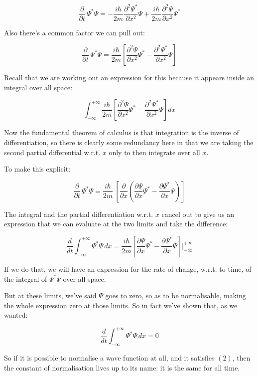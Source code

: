 $$
\frac{\partial}{\partial t} \, \Psi^*\Psi
=
- \frac{i \hbar}{2m} \frac{\partial^2 \Psi^*}{\partial x^2}
\Psi
+
\frac{i \hbar}{2m} \frac{\partial^2 \Psi}{\partial x^2}
\Psi^*
$$

Also there's a common factor we can pull out:

$$
\frac{\partial}{\partial t} \, \Psi^*\Psi
=
\frac{i \hbar}{2m}
\left[
\frac{\partial^2 \Psi}{\partial x^2}\Psi^*
- \frac{\partial^2 \Psi^*}{\partial x^2}\Psi
\right]
$$

Recall that we are working out an expression for this because it appears inside an integral over all space:

$$
\int_{-\infty}^{+\infty}
\frac{i \hbar}{2m}
\left[
\frac{\partial^2 \Psi}{\partial x^2}\Psi^*
- \frac{\partial^2 \Psi^*}{\partial x^2}\Psi
\right]
dx
$$

Now the fundamental theorem of calculus is that integration is the inverse of differentiation, so there is clearly some redundancy here in that we are taking the second partial differential w.r.t. $x$ only to then integrate over all $x$.

To make this explicit:

$$
\label{byparts}
\frac{\partial}{\partial t} \, \Psi^*\Psi
=
\frac{i \hbar}{2m} \
\left[
\frac{\partial}{\partial x}
\left(
\frac{\partial \Psi}{\partial x}\Psi^*
- \frac{\partial \Psi^*}{\partial x}\Psi
\right)
\right]
$$

The integral and the partial differentiation w.r.t. $x$ cancel out to give us an expression that we can evaluate at the two limits and take the difference:

$$
\frac{d}{d t}
\int_{-\infty}^{+\infty}
\Psi^*\Psi
\,dx
=
\frac{i \hbar}{2m}
\left[
\frac{\partial \Psi}{\partial x}\Psi^*
- \frac{\partial \Psi^*}{\partial x}\Psi
\right]
\bigg\rvert_{-\infty}^{+\infty}
$$

If we do that, we will have an expression for the rate of change, w.r.t. to time, of the integral of $\Psi^*\Psi$ over all space.

But at these limits, we've said $\Psi$ goes to zero, so as to be normalisable, making the whole expression zero at those limits. So in fact we've shown that, as we wanted:

$$
\frac{d}{d t}
\int_{-\infty}^{+\infty}
\Psi^*\Psi
\,dx
= 0
$$

So if it is possible to normalise a wave function at all, and it satisfies $(2)$, then the constant of normalisation lives up to its name: it is the same for all time.


